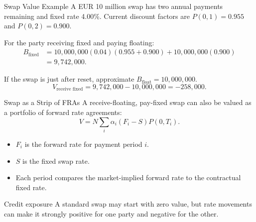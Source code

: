 \documentclass[aspectratio=169,11pt]{beamer}
\newcommand{\notional}{N}
\begin{document}
\begin{frame}{Swap Value Example}
    \small
    A EUR 10 million swap has two annual payments remaining and fixed rate 4.00\%.
    Current discount factors are \(P(0,1)=0.955\) and \(P(0,2)=0.900\).

    For the party receiving fixed and paying floating:
    \[
    \begin{aligned}
        B_{\text{fixed}}
        &=
        10{,}000{,}000(0.04)(0.955+0.900)
        +10{,}000{,}000(0.900)\\
        &=
        9{,}742{,}000.
    \end{aligned}
    \]

    If the swap is just after reset, approximate \(B_{\text{float}}=10{,}000{,}000\).
    \[
        V_{\text{receive fixed}}=9{,}742{,}000-10{,}000{,}000=-258{,}000.
    \]
\end{frame}

\begin{frame}{Swap as a Strip of FRAs}
    A receive-floating, pay-fixed swap can also be valued as a portfolio of forward rate agreements:
    \[
        V
        =
        \notional\sum_i \alpha_i (F_i-S)P(0,T_i).
    \]

    \begin{itemize}
        \item \(F_i\) is the forward rate for payment period \(i\).
        \item \(S\) is the fixed swap rate.
        \item Each period compares the market-implied forward rate to the contractual fixed rate.
    \end{itemize}

    \begin{alertblock}{Credit exposure}
        A standard swap may start with zero value, but rate movements can make it strongly positive for one party and negative for the other.
    \end{alertblock}
\end{frame}
\end{document}
